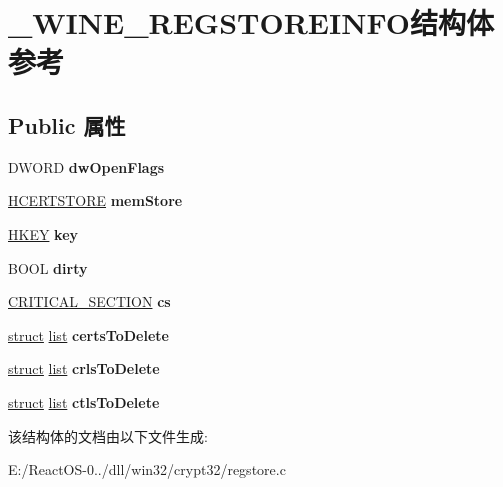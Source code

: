 \hypertarget{struct___w_i_n_e___r_e_g_s_t_o_r_e_i_n_f_o}{}\section{\+\_\+\+W\+I\+N\+E\+\_\+\+R\+E\+G\+S\+T\+O\+R\+E\+I\+N\+F\+O结构体 参考}
\label{struct___w_i_n_e___r_e_g_s_t_o_r_e_i_n_f_o}
\subsection*{Public 属性}
\begin{DoxyCompactItemize}
\item 
\mbox{\label{struct___w_i_n_e___r_e_g_s_t_o_r_e_i_n_f_o_a11cceb1d1e39dc2f7eac4418ff3468b7}} 
D\+W\+O\+RD {\bfseries dw\+Open\+Flags}
\item 
\mbox{\label{struct___w_i_n_e___r_e_g_s_t_o_r_e_i_n_f_o_a7018dbaade79033be3b0bfdb5b2ba4d0}} 
\hyperlink{interfacevoid}{H\+C\+E\+R\+T\+S\+T\+O\+RE} {\bfseries mem\+Store}
\item 
\mbox{\label{struct___w_i_n_e___r_e_g_s_t_o_r_e_i_n_f_o_a0e3198d26c1d468a75678950e76a7c63}} 
\hyperlink{interfacevoid}{H\+K\+EY} {\bfseries key}
\item 
\mbox{\label{struct___w_i_n_e___r_e_g_s_t_o_r_e_i_n_f_o_a64301053db2e02d6c4aad54513c87780}} 
B\+O\+OL {\bfseries dirty}
\item 
\mbox{\label{struct___w_i_n_e___r_e_g_s_t_o_r_e_i_n_f_o_ae848927352aa6a6926e7e302433c204a}} 
\hyperlink{struct___c_r_i_t_i_c_a_l___s_e_c_t_i_o_n}{C\+R\+I\+T\+I\+C\+A\+L\+\_\+\+S\+E\+C\+T\+I\+ON} {\bfseries cs}
\item 
\mbox{\label{struct___w_i_n_e___r_e_g_s_t_o_r_e_i_n_f_o_a1c240ab8ef2e811eb8e3f1edc545176c}} 
\hyperlink{interfacestruct}{struct} \hyperlink{classlist}{list} {\bfseries certs\+To\+Delete}
\item 
\mbox{\label{struct___w_i_n_e___r_e_g_s_t_o_r_e_i_n_f_o_a11c501d1f738d3eb5ec1d591b25c4999}} 
\hyperlink{interfacestruct}{struct} \hyperlink{classlist}{list} {\bfseries crls\+To\+Delete}
\item 
\mbox{\label{struct___w_i_n_e___r_e_g_s_t_o_r_e_i_n_f_o_aaa36bf5d2d3bcef8784d83322356039e}} 
\hyperlink{interfacestruct}{struct} \hyperlink{classlist}{list} {\bfseries ctls\+To\+Delete}
\end{DoxyCompactItemize}


该结构体的文档由以下文件生成\+:\begin{DoxyCompactItemize}
\item 
E\+:/\+React\+O\+S-\/0../dll/win32/crypt32/regstore.\+c\end{DoxyCompactItemize}
